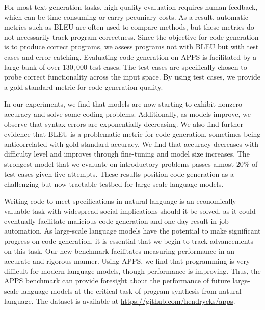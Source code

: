 \documentclass{article}
\begin{document}
For most text generation tasks, high-quality evaluation requires human feedback, which can be time-consuming or carry pecuniary costs. As a result, automatic metrics such as BLEU \citep{papineni2002bleu} are often used to compare methods, but these metrics do not necessarily track program correctness. Since the objective for code generation is to produce correct programs, we assess programs not with BLEU but with test cases and error catching. Evaluating code generation on APPS is facilitated by a large bank of over $130,\!000$ test cases. The test cases are specifically chosen to probe correct functionality across the input space. By using test cases, we provide a gold-standard metric for code generation quality.

In our experiments, we find that models are now starting to exhibit nonzero accuracy and solve some coding problems. Additionally, as models improve, we observe that syntax errors are exponentially decreasing. We also find further evidence that BLEU is a problematic metric for code generation, sometimes being anticorrelated with gold-standard accuracy. We find that accuracy decreases with difficulty level and improves through fine-tuning and model size increases. The strongest model that we evaluate on introductory problems passes almost $20\%$ of test cases given five attempts. These results position code generation as a challenging but now tractable testbed for large-scale language models.

Writing code to meet specifications in natural language is an economically valuable task with widespread social implications should it be solved, as it could eventually facilitate malicious code generation and one day result in job automation. As large-scale language models have the potential to make significant progress on code generation, it is essential that we begin to track advancements on this task. Our new benchmark facilitates measuring performance in an accurate and rigorous manner. Using APPS, we find that programming is very difficult for modern language models, though performance is improving. Thus, the APPS benchmark can provide foresight about the performance of future large-scale language models at the critical task of program synthesis from natural language. The dataset is available at \href{https://github.com/hendrycks/apps}{https://github.com/hendrycks/apps}.







 
\end{document}
